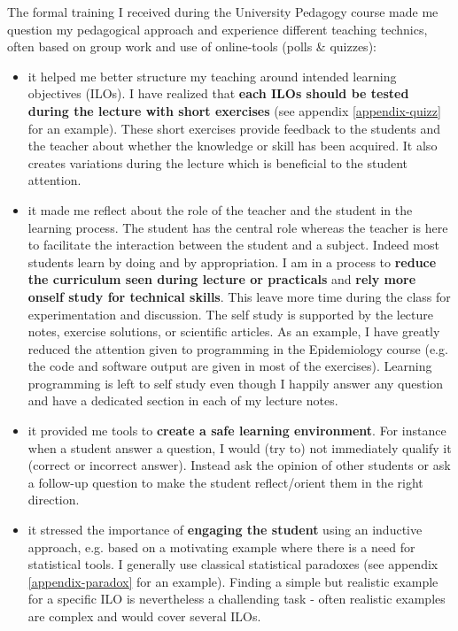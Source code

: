 \documentclass[12pt]{article}
\begin{document}
The formal training I received during the University Pedagogy course
made me question my pedagogical approach and experience different
teaching technics, often based on group work and use of online-tools
(polls \& quizzes):
\begin{itemize}
\item it helped me better structure my teaching around intended learning
objectives (ILOs). I have realized that \textbf{each ILOs should be tested
during the lecture with short exercises} (see appendix
\ref{appendix-quizz} for an example). These short exercises provide
feedback to the students and the teacher about whether the knowledge
or skill has been acquired. It also creates variations during the
lecture which is beneficial to the student attention.

\item it made me reflect about the role of the teacher and the student in
the learning process. The student has the central role whereas the
teacher is here to facilitate the interaction between the student
and a subject. Indeed most students learn by doing and by
appropriation. I am in a process to \textbf{reduce the curriculum seen
during lecture or practicals} and \textbf{rely more onself study for
technical skills}. This leave more time during the class for
experimentation and discussion. The self study is supported by the
lecture notes, exercise solutions, or scientific articles. \newline
As an example, I have greatly reduced the attention given to
programming in the Epidemiology course (e.g. the code and software
output are given in most of the exercises). Learning programming is
left to self study even though I happily answer any question and
have a dedicated section in each of my lecture notes.

\item it provided me tools to \textbf{create a safe learning environment}. For
instance when a student answer a question, I would (try to) not
immediately qualify it (correct or incorrect answer). Instead ask the
opinion of other students or ask a follow-up question to make the
student reflect/orient them in the right direction.

\item it stressed the importance of \textbf{engaging the student} using an
inductive approach, e.g. based on a motivating example where there
is a need for statistical tools. I generally use classical
statistical paradoxes (see appendix \ref{appendix-paradox} for an
example). Finding a simple but realistic example for a specific ILO
is nevertheless a challending task - often realistic examples are
complex and would cover several ILOs.
\end{itemize}
\end{document}
